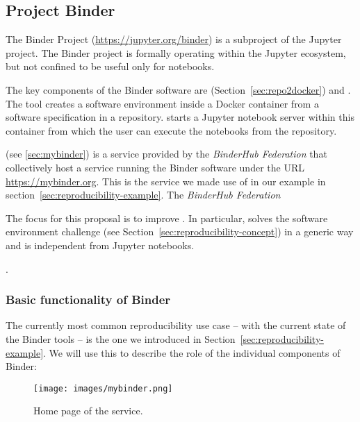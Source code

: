 \subsection{Project Binder}\label{seq:project-binder}

The Binder Project \cite{binder} (\url{https://jupyter.org/binder}) is
a subproject of the Jupyter project. The Binder project is formally operating
within the Jupyter ecosystem, but not confined to be useful only for notebooks.

The key components of the Binder software are \repotodocker{}
(Section~\ref{sec:repo2docker}) and \binderhub{}. The \repotodocker{} tool
creates a software environment inside a Docker container from a software
specification in a repository. \binderhub{} starts a Jupyter notebook server
within this container from which the user can execute the notebooks from the
repository.

\emph{\mybinder{}} (see \ref{sec:mybinder}) is a service provided by the \emph{BinderHub
Federation} that collectively host a service running the Binder software
under the URL \url{https://mybinder.org}. This is the service we made use of in
our example in section~\ref{sec:reproducibility-example}. The \emph{BinderHub Federation}

The focus for this proposal is to improve \repotodocker{}. In particular,
\repotodocker{} solves the software environment challenge (see
Section~\ref{sec:reproducibility-concept}) in a generic way and is independent
from Jupyter notebooks.

.

\subsubsection{Basic functionality of Binder}
\label{binder-how-does-it-work}

The currently most common reproducibility use case -- with the current state of the Binder
tools -- is the one we introduced in
Section~\ref{sec:reproducibility-example}. We will use this to
describe the role of the individual components of Binder:


\begin{figure}[ht]
  \centering
    \texttt{[image: images/mybinder.png]}
    \caption{Home page of the \mybinder{} service.}
    \label{fig:mybinder-homepage}
\end{figure}


